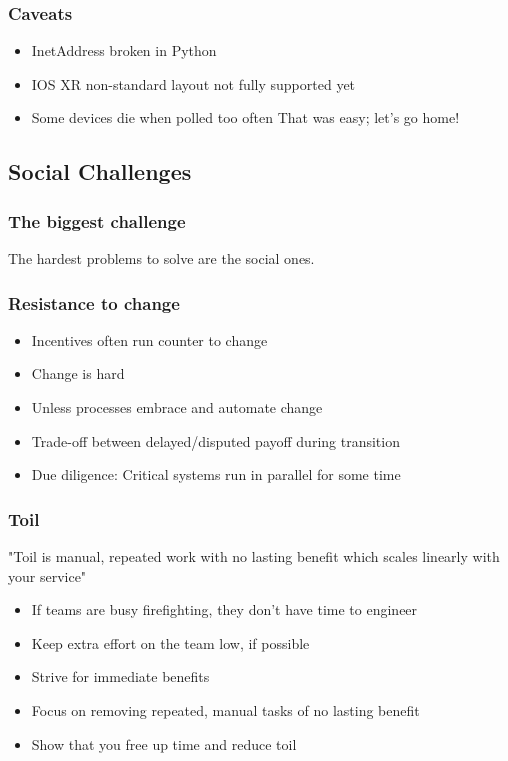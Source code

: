 \documentclass[t]{beamer}
\begin{document}
\begin{frame}
	\frametitle{Caveats}
	\begin{itemize}
		\item InetAddress broken in Python
		\item IOS XR non-standard layout not fully supported yet 
		\item Some devices die when polled too often
		\vfill
			That was easy; let's go home!
	\end{itemize}
\end{frame}


\subsection{Social Challenges}

\begin{frame}
	\frametitle{The biggest challenge}
		\begin{center}
			\vfill
			The hardest problems to solve are the social ones.
			\vfill
		\end{center}
\end{frame}

\begin{frame}
	\frametitle{Resistance to change}
	\begin{itemize}
		\item Incentives often run counter to change
		\item Change is hard
		\item Unless processes embrace and automate change
		\item Trade-off between delayed/disputed payoff during transition
		\item Due diligence: Critical systems run in parallel for some time
	\end{itemize}
\end{frame}

\begin{frame}
	\frametitle{Toil}
	"Toil is manual, repeated work with no lasting benefit which scales linearly with your service"
	\vfill
	\begin{itemize}
		\item If teams are busy firefighting, they don't have time to engineer
		\item Keep extra effort on the team low, if possible
		\item Strive for immediate benefits
		\item Focus on removing repeated, manual tasks of no lasting benefit
		\item Show that you free up time and reduce toil
	\end{itemize}
	\vfill
\end{frame}
\end{document}
